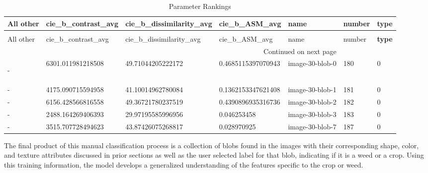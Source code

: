 \documentclass[letterpaper, notitlepage]{report}
\begin{document}
\begin{tiny}
\begin{longtable}{lllllll}
\caption[Vegetation Type after Manual Classification]{Vegetation Type after Manual Classification}\\
\toprule
All other & cie\_b\_contrast\_avg	 & cie\_b\_dissimilarity\_avg	& cie\_b\_ASM\_avg	& name & number & \textbf{type} \\
\midrule
\endfirsthead
\caption[]{Parameter Rankings} \\
\toprule
All other & cie\_b\_contrast\_avg	 & cie\_b\_dissimilarity\_avg	& cie\_b\_ASM\_avg	& name & number & \textbf{type} \\
\midrule
\endhead
\midrule
\multicolumn{5}{r}{{Continued on next page}} \\
\midrule
\endfoot

\bottomrule
\label{tab:extract}
\endlastfoot

- &6301.011981218508	&49.71044205222172	&0.4685115397070943	&image-30-blob-0	&180	&0 \\
- &4175.090715594958	&41.10014962780084	&0.1362153347621408	&image-30-blob-1	&181	&0 \\
- &6156.428566816558	&49.36721780237519	&0.4390896935316736	&image-30-blob-2	&182	&0 \\
- &2488.164269406393	&29.97195585996956	&0.046253458	           &image-30-blob-3	&183	&0 \\
- &3515.707728494623	&43.87426075268817	&0.028970925	           &image-30-blob-7	&187	&0

\end{longtable}
\end{tiny}

The final product of this manual classification process is a collection of blobs found in the images with their corresponding shape, color, and texture attributes discussed in prior sections as well as the user selected label for that blob, indicating if it is a weed or a crop. Using this training information, the model develops a generalized understanding of the features specific to the crop or weed.
%
%
\end{document}
